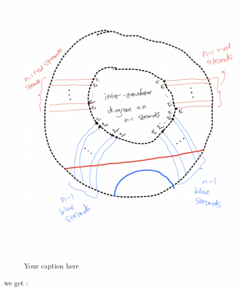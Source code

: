 \begin{figure}[H] %
    \centering
    \includegraphics[width=\linewidth]{diagrams/theorem14/2.png} %
    \caption{Your caption here}
    \label{fig:your-label}
\end{figure}

we get :

